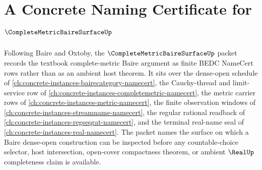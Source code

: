 \chapter{A Concrete Naming Certificate for $\CompleteMetricBaireSurfaceUp$}
\label{ch:concrete-instances-complete-metric-baire-surface-namecert}

Following Baire and Oxtoby, the $\CompleteMetricBaireSurfaceUp$ packet records the textbook complete-metric Baire argument as finite BEDC NameCert rows rather than as an ambient host theorem. It sits over the dense-open schedule of \autoref{ch:concrete-instances-bairecategory-namecert}, the Cauchy-thread and limit-service row of \autoref{ch:concrete-instances-completemetric-namecert}, the metric carrier rows of \autoref{ch:concrete-instances-metric-namecert}, the finite observation windows of \autoref{ch:concrete-instances-streamname-namecert}, the regular rational readback of \autoref{ch:concrete-instances-regseqrat-namecert}, and the terminal real-name seal of \autoref{ch:concrete-instances-real-namecert}. The packet names the surface on which a Baire dense-open construction can be inspected before any countable-choice selector, host intersection, open-cover compactness theorem, or ambient $\RealUp$ completeness claim is available.

